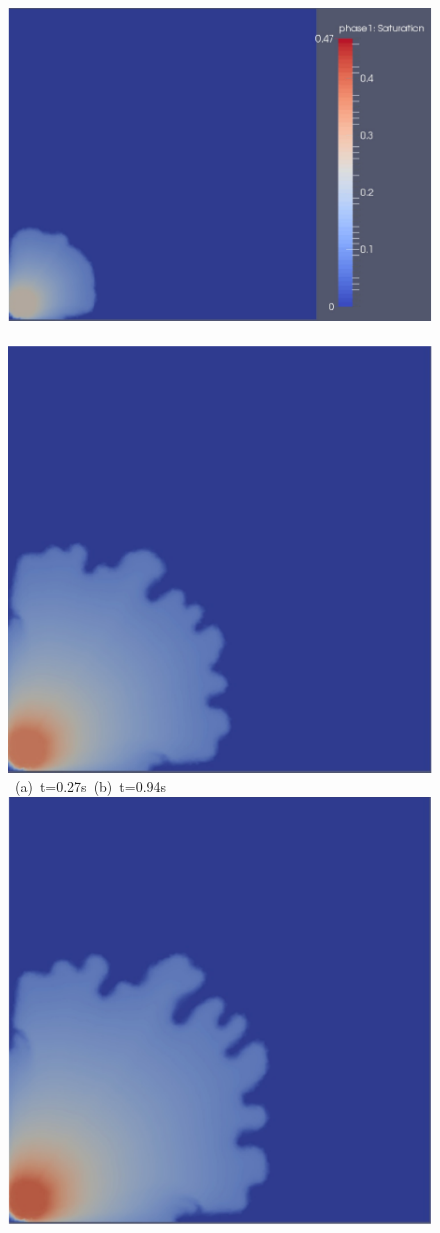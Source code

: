 \begin{landscape}
\begin{figure}[ht] 
\vbox{\vspace{-1cm}
\hbox{\includegraphics[width=.9\textwidth, height=0.5\textwidth]{./Pics1/Saffman_homogeneous_VR150/ST_Homog_VR150_D300b}
\hspace{0.5cm}      
      \includegraphics[width=.5\textwidth]{./Pics1/Saffman_homogeneous_VR150/ST_Homog_VR150_D1600b}}
\vspace{0.cm}
\hbox{\hspace{5.cm} (a) t=0.27s \hspace{8.cm} (b) t=0.94s }
\vspace{0.5cm}
\hbox{
      \includegraphics[width=.5\textwidth]{./Pics1/Saffman_homogeneous_VR150/ST_Homog_VR150_D2700b}
}}
\end{figure}
\end{landscape}
